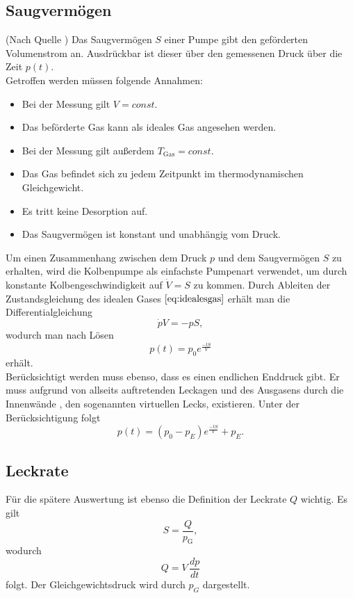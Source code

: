 \subsection{Saugvermögen}
(Nach Quelle \cite{anleitung})
Das Saugvermögen $S$ einer Pumpe gibt den geförderten Volumenstrom an.
Ausdrückbar ist dieser über den gemessenen Druck über die Zeit $p(t)$.\\
Getroffen werden müssen folgende Annahmen:
\begin{itemize}
  \item Bei der Messung gilt $V=const$.
  \item Das beförderte Gas kann als ideales Gas angesehen werden.
  \item Bei der Messung gilt außerdem $T_\text{Gas}=const$.
  \item Das Gas befindet sich zu jedem Zeitpunkt im thermodynamischen Gleichgewicht.
  \item Es tritt keine Desorption auf.
  \item Das Saugvermögen ist konstant und unabhängig vom Druck.
\end{itemize}
Um einen Zusammenhang zwischen dem Druck $p$ und dem Saugvermögen $S$ zu erhalten, wird die Kolbenpumpe als einfachste Pumpenart verwendet,
um durch konstante Kolbengeschwindigkeit auf $\dot{V}=S$ zu kommen.
Durch Ableiten der Zustandsgleichung des idealen Gases $\ref{eq:idealesgas}$ erhält man die Differentialgleichung
\begin{equation}
  \dot{p}V=-pS,
\end{equation}
wodurch man nach Lösen
\begin{equation}
  p(t)=p_0 e^{\frac{-tS}{V}}
\end{equation}
erhält.\\
Berücksichtigt werden muss ebenso, dass es einen endlichen Enddruck gibt.
Er muss aufgrund von allseits auftretenden Leckagen und des Ausgasens durch die Innenwände , den sogenannten virtuellen Lecks, existieren.
Unter der Berücksichtigung folgt
\begin{equation}
    p(t)=(p_0-p_E) e^{\frac{-tS}{V}}+p_E.
\end{equation}
\subsection{Leckrate}
Für die spätere Auswertung ist ebenso die Definition der Leckrate $Q$ wichtig. Es gilt
\begin{equation}
  S=\frac{Q}{p_\text{G}},
  \label{eq:leckrate1}
\end{equation}
wodurch
\begin{equation}
  Q=V \, \frac{dp}{dt}
  \label{eq:leckrate2}
\end{equation}
folgt.
Der Gleichgewichtsdruck wird durch $p_G$ dargestellt.
